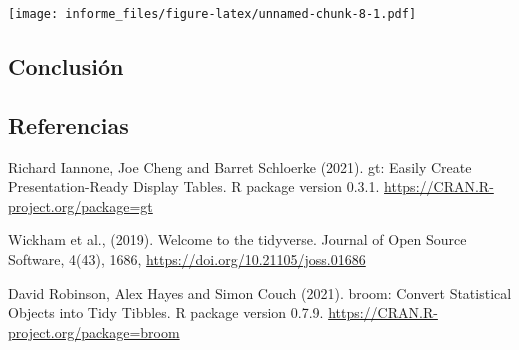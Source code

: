 \documentclass[
]{article}
\begin{document}
\texttt{[image: informe\_files/figure-latex/unnamed-chunk-8-1.pdf]}

\hypertarget{conclusiuxf3n}{%
\subsection{Conclusión}\label{conclusiuxf3n}}

\hypertarget{referencias}{%
\subsection{Referencias}\label{referencias}}

Richard Iannone, Joe Cheng and Barret Schloerke (2021). gt: Easily
Create Presentation-Ready Display Tables. R package version 0.3.1.
\url{https://CRAN.R-project.org/package=gt}

Wickham et al., (2019). Welcome to the tidyverse. Journal of Open Source
Software, 4(43), 1686, \url{https://doi.org/10.21105/joss.01686}

David Robinson, Alex Hayes and Simon Couch (2021). broom: Convert
Statistical Objects into Tidy Tibbles. R package version 0.7.9.
\url{https://CRAN.R-project.org/package=broom}
\end{document}
